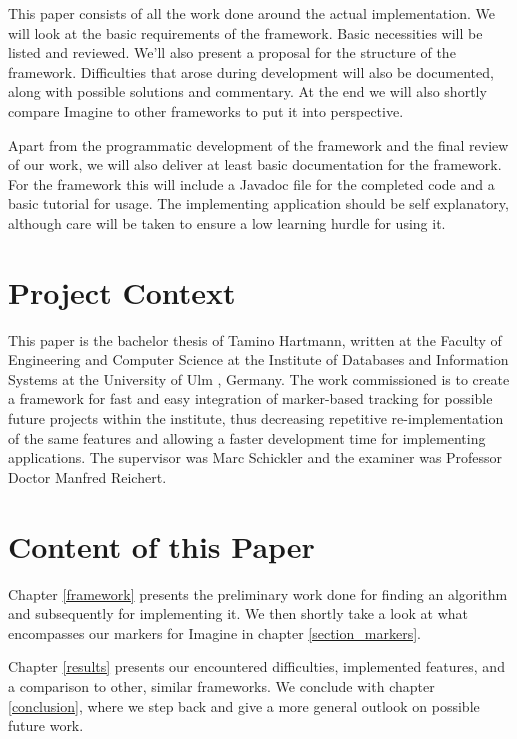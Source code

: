 This paper consists of all the work done around the actual implementation.
We will look at the basic requirements of the framework.
Basic necessities will be listed and reviewed.
We'll also present a proposal for the structure of the framework.
Difficulties that arose during development will also be documented, along with possible solutions and commentary.
At the end we will also shortly compare Imagine to other frameworks to put it into perspective.

Apart from the programmatic development of the framework and the final review of our work, we will also deliver at least basic documentation for the framework.
For the framework this will include a Javadoc \cite{docjava} file for the completed code and a basic tutorial for usage.
The implementing application should be self explanatory, although care will be taken to ensure a low learning hurdle for using it.

\section{Project Context}

This paper is the bachelor thesis of Tamino Hartmann, written at the Faculty of Engineering and Computer Science \cite{faculty} at the Institute of Databases and Information Systems at the University of Ulm \cite{ulmuni}, Germany.
The work commissioned is to create a framework for fast and easy integration of marker-based tracking for possible future projects within the institute, thus decreasing repetitive re-implementation of the same features and allowing a faster development time for implementing applications.
The supervisor was Marc Schickler and the examiner was Professor Doctor Manfred Reichert.

\section{Content of this Paper}

Chapter \ref{framework} presents the preliminary work done for finding an algorithm and subsequently for implementing it.
We then shortly take a look at what encompasses our markers for Imagine in chapter \ref{section_markers}.

Chapter \ref{results} presents our encountered difficulties, implemented features, and a comparison to other, similar frameworks.
We conclude with chapter \ref{conclusion}, where we step back and give a more general outlook on possible future work.
